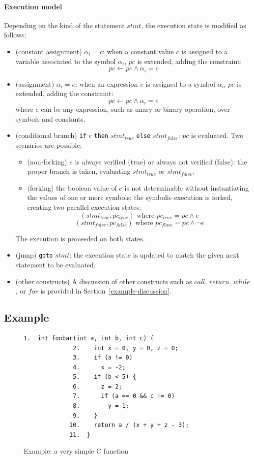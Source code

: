 \documentclass[10pt, a4paper]{article}
\begin{document}
\paragraph{Execution model} Depending on the kind of the statement $stmt$, the execution state is modified as follows:
\begin{itemize}
  \item (constant assignment) $\alpha_i = c$: when a constant value $c$ is assigned to a variable associated to the symbol $\alpha_i$, $pc$ is extended, adding the constraint:
    \[ pc \gets pc \wedge \alpha_i = c\]
  \item (assignment) $\alpha_i = e$: when an expression $e$ is assigned to a symbol $\alpha_i$, $pc$ is extended, adding the constraint:
    \[ pc \gets pc \wedge \alpha_i = e\]
  where $e$ can be any expression, such as unary or binary operation, over symbols and constants.
  \item (conditional branch) {\tt if} $e$ {\tt then} $stmt_{true}$ {\tt else} $stmt_{false}$: $pc$ is evaluated. Two scenarios are possible:
    \begin{itemize}
      \item (non-forking) $e$ is always verified (true) or always not verified (false): the proper branch is taken, evaluating $stmt_{true}$ or $stmt_{false}$.
      \item (forking) the boolean value of $e$ is not determinable without instantiating the values of one or more symbols: the symbolic execution is forked, creating two parallel execution states:
        \[ (stmt_{true}, pc_{true}) \text{ where } pc_{true} = pc \wedge e \]
        \[ (stmt_{false}, pc_{false}) \text{ where } pc_{flase} = pc \wedge \neg e \]
    \end{itemize}
    The execution is proceeded on both states.
  \item (jump) {\tt goto} $stmt$: the execution state is updated to match the given next statement to be evaluated. 
  \item (other constructs) A discussion of other constructs such as $call$, $return$, $while$, or $for$ is provided in Section~\ref{example-discussion}. 
\end{itemize}

\subsection{Example}
\label{symbolic-execution-example}

\begin{figure}[t]
\begin{lstlisting}[basicstyle=\ttfamily\small]
              1.  int foobar(int a, int b, int c) {
              2.    int x = 0, y = 0, z = 0;
              3.    if (a != 0)
              4.      x = -2;
              5.    if (b < 5) {
              6.      z = 2;
              7.      if (a == 0 && c != 0)
              8.        y = 1;
              9.    }
             10.    return a / (x + y + z - 3);
             11.  }
\end{lstlisting}
\label{fig:example-1}
\caption{Example: a very simple C function}
\end{figure}
\end{document}
